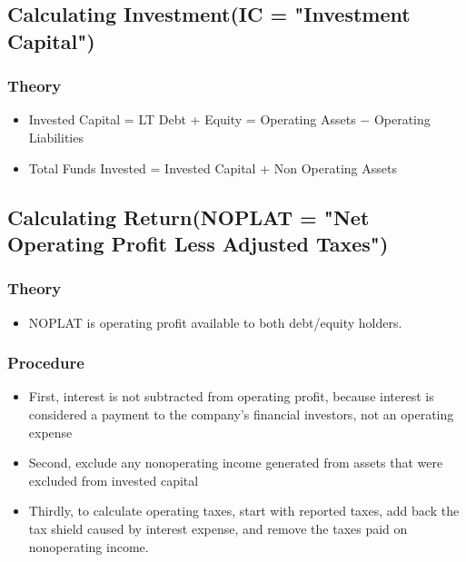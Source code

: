 \documentclass[11pt]{article}
\begin{document}
\subsection*{Calculating Investment(IC = "Investment Capital")}
\label{sec:org5caee77}
\subsubsection*{Theory}
\label{sec:org67677a5}
\begin{itemize}
\item Invested Capital = LT Debt + Equity = Operating Assets − Operating Liabilities
\label{sec:org6adcc58}
\item Total Funds Invested = Invested Capital + Non Operating Assets
\label{sec:orgfafbba5}
\end{itemize}

\subsection*{Calculating Return(NOPLAT = "Net Operating Profit Less Adjusted Taxes")}
\label{sec:org5e850ac}
\subsubsection*{Theory}
\label{sec:orgf34011c}
\begin{itemize}
\item NOPLAT is operating profit available to both debt/equity holders.
\label{sec:org9924a57}
\end{itemize}
\subsubsection*{Procedure}
\label{sec:orgc9aaace}
\begin{itemize}
\item First, interest is not subtracted from operating profit, because interest is considered a payment to the company’s financial investors, not an operating expense
\label{sec:org66acf2d}
\item Second, exclude any nonoperating income generated from assets that were excluded from invested capital
\label{sec:org0ddee74}
\item Thirdly, to calculate operating taxes, start with reported taxes, add back the tax shield caused by interest expense, and remove the taxes paid on nonoperating income.
\label{sec:orgadfe9e8}
\end{itemize}
\end{document}
